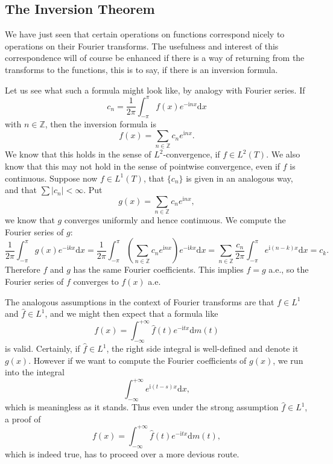 \subsection{The Inversion Theorem}
We have just seen that certain operations on functions correspond nicely to operations on their Fourier transforms. The usefulness and interest of this correspondence will of course be enhanced if there is a way of returning from the transforms to the functions, this is to say, if there is an inversion formula.\par
Let us see what such a formula might look like, by analogy with Fourier series. If 
$$
c_n=\frac{1}{2\pi}\int_{-\pi}^{\pi}{f\left( x \right) e^{-\mathrm{i}nx}\mathrm{d}x}
$$
with $n\in\mathbb{Z}$, then the inversion formula is 
$$
f\left( x \right) =\sum_{n\in \mathbb{Z}}{c_ne^{\mathrm{i}nx}}.
$$
We know that this holds in the sense of $L^2$-convergence, if $f\in L^2(T)$. We also know that this may not hold in the sense of pointwise convergence, even if $f$ is continuous. Suppose now $f\in L^1(T)$, that $\{c_n\}$ is given in an analogous way, and that $\sum|c_n|<\infty$. Put 
$$
g\left( x \right) =\sum_{n\in \mathbb{Z}}{c_ne^{\mathrm{i}nx}},
$$
we know that $g$ converges uniformly and hence continuous. We compute the Fourier series of $g$: 
$$
\frac{1}{2\pi}\int_{-\pi}^{\pi}{g\left( x \right) e^{-\mathrm{i}kx}\mathrm{d}x}=\frac{1}{2\pi}\int_{-\pi}^{\pi}{\left( \sum_{n\in \mathbb{Z}}{c_ne^{\mathrm{i}nx}} \right) e^{-\mathrm{i}kx}\mathrm{d}x}=\sum_{n\in \mathbb{Z}}{\frac{c_n}{2\pi}\int_{-\pi}^{\pi}{e^{\mathrm{i}\left( n-k \right) x}\mathrm{d}x}}=c_k.
$$
Therefore $f$ and $g$ has the same Fourier coefficients. This implies $f=g$ a.e., so the Fourier series of $f$ converges to $f(x)$ a.e.\par
The analogous assumptions in the context of Fourier transforms are that $f\in L^1$ and $\widehat{f}\in L^1$, and we might then expect that a formula like 
$$
f\left( x \right) =\int_{-\infty}^{+\infty}{\widehat{f}\left( t \right) e^{-\mathrm{i}tx}\mathrm{d}m\left( t \right)}
$$
is valid. Certainly, if $\widehat{f}\in L^1$, the right side integral is well-defined and denote it $g(x)$. However if we want to compute the Fourier coefficients of $g(x)$, we run into the integral 
$$
\int_{-\infty}^{+\infty}{e^{\mathrm{i}\left( t-s \right) x}\mathrm{d}x},
$$
which is meaningless as it stands. Thus even under the strong assumption $\widehat{f}\in L^1$, a proof of 
$$
f\left( x \right) =\int_{-\infty}^{+\infty}{\widehat{f}\left( t \right) e^{-\mathrm{i}tx}\mathrm{d}m\left( t \right)},
$$
which is indeed true, has to proceed over a more devious route.
